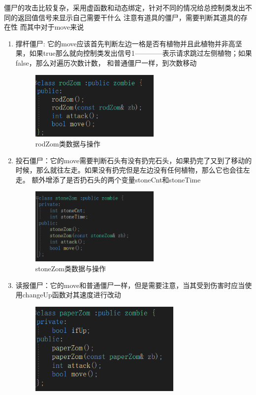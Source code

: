 \documentclass[12pt,a4paper,UTF8]{article}
\begin{document}
      僵尸的攻击比较复杂，采用虚函数和动态绑定，针对不同的情况给总控制类发出不同的返回值信号来显示自己需要干什么
      注意有道具的僵尸，需要判断其道具的存在性
      而其中对于move来说
      \begin{enumerate}
        \item 撑杆僵尸: 它的move应该首先判断左边一格是否有植物并且此植物并非高坚果，如果true那么就向控制类发出信号1————表示请求跳过左侧植物；如果false，那么对遍历次数计数，
        和普通僵尸一样，到次数移动
        \begin{figure}[H]
          \centering
        \includegraphics[width=0.6\textwidth]{figure/rodZom.png}
        \caption{rodZom类数据与操作}
      \end{figure}
        \item 投石僵尸：它的move需要判断石头有没有扔完石头，如果扔完了又到了移动的时候，那么就往左走。如果没有扔完但是左边没有任何植物，那么它也会往左走。
        额外增添了是否扔石头的两个变量stoneCnt和stoneTime
        \begin{figure}[H]
          \centering
        \includegraphics[width=0.6\textwidth]{figure/stoneZom.png}
        \caption{stoneZom类数据与操作}
      \end{figure}
        \item 读报僵尸：它的move和普通僵尸一样，但是需要注意，当其受到伤害时应当使用changeUp函数对其速度进行改动
        \begin{figure}[H]
          \centering
        \includegraphics[width=0.7\textwidth]{figure/paperZom.png}

\end{figure}
\end{enumerate}
\end{document}
